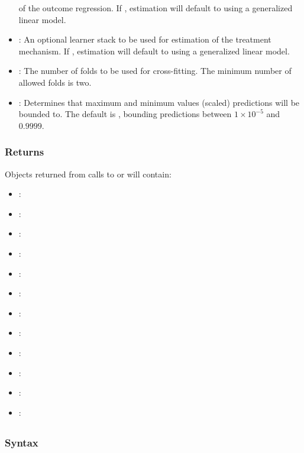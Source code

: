 \documentclass[]{jss}
\begin{document}
\begin{itemize}
  of the outcome regression. If , estimation will default to using a generalized linear model.
  \item {}: An optional  learner stack to be used for estimation
  of the treatment mechanism. If , estimation will default to using a generalized linear model.
  \item {}: The number of folds to be used for cross-fitting. The minimum number of allowed folds is two.
  \item {}: Determines that maximum and minimum values (scaled) predictions will be
  bounded to. The default is , bounding predictions between \(1\times10^{-5}\) and \(0.9999\).
  
\end{itemize}

\subsubsection{Returns}

Objects returned from calls to  or  will contain:

\begin{itemize}

  \item {}:
  \item {}:
  \item {}:
  \item {}:
  \item {}:
  \item {}:
  \item {}:
  \item {}:
  \item {}:
  \item {}:
  \item {}:
  \item {}:
  
\end{itemize}

\subsection[lmtp_contrast]{}

\subsubsection{Syntax}
\end{document}
